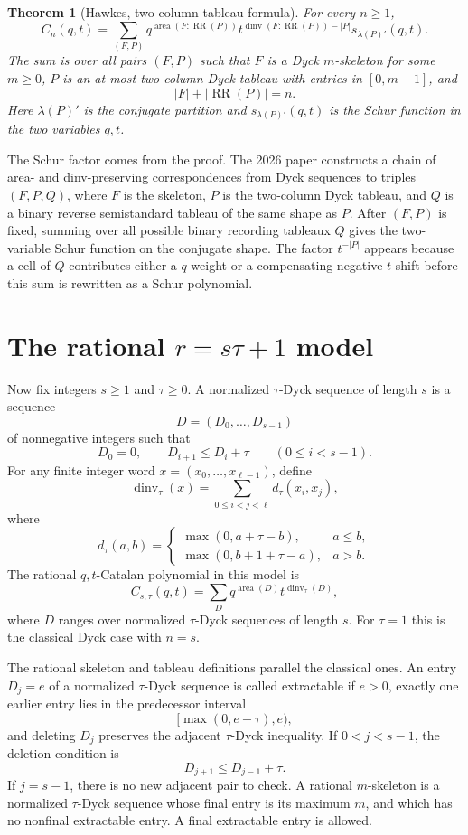 \documentclass{article}
\DeclareMathOperator{\area}{area}
\DeclareMathOperator{\dinv}{dinv}
\DeclareMathOperator{\RR}{RR}
\newtheorem{theorem}{Theorem}
\begin{document}
\begin{theorem}[Hawkes, two-column tableau formula]
For every \(n\ge1\),
\[
  C_n(q,t)
  =
  \sum_{(F,P)}
  q^{\area(F:\RR(P))}
  t^{\dinv(F:\RR(P))-|P|}
  s_{\lambda(P)'}(q,t).
\]
The sum is over all pairs \((F,P)\) such that \(F\) is a Dyck
\(m\)-skeleton for some \(m\ge0\), \(P\) is an at-most-two-column Dyck
tableau with entries in \([0,m-1]\), and
\[
  |F|+|\RR(P)|=n.
\]
Here \(\lambda(P)'\) is the conjugate partition and
\(s_{\lambda(P)'}(q,t)\) is the Schur function in the two variables \(q,t\).
\end{theorem}

The Schur factor comes from the proof.  The 2026 paper constructs a chain of
area- and dinv-preserving correspondences from Dyck sequences to triples
\((F,P,Q)\), where \(F\) is the skeleton, \(P\) is the two-column Dyck
tableau, and \(Q\) is a binary reverse semistandard tableau of the same shape
as \(P\).  After \((F,P)\) is fixed, summing over all possible binary
recording tableaux \(Q\) gives the two-variable Schur function on the
conjugate shape.  The factor \(t^{-|P|}\) appears because a cell of \(Q\)
contributes either a \(q\)-weight or a compensating negative \(t\)-shift before
this sum is rewritten as a Schur polynomial.

\section{The rational \(r=s\tau+1\) model}

Now fix integers \(s\ge1\) and \(\tau\ge0\).  A normalized \(\tau\)-Dyck
sequence of length \(s\) is a sequence
\[
  D=(D_0,\ldots,D_{s-1})
\]
of nonnegative integers such that
\[
  D_0=0,
  \qquad
  D_{i+1}\le D_i+\tau
  \qquad(0\le i<s-1).
\]
For any finite integer word \(x=(x_0,\ldots,x_{\ell-1})\), define
\[
  \dinv_\tau(x)
  =
  \sum_{0\le i<j<\ell} d_\tau(x_i,x_j),
\]
where
\[
  d_\tau(a,b)=
  \begin{cases}
    \max(0,a+\tau-b),& a\le b,\\
    \max(0,b+1+\tau-a),& a>b.
  \end{cases}
\]
The rational \(q,t\)-Catalan polynomial in this model is
\[
  C_{s,\tau}(q,t)
  =
  \sum_D q^{\area(D)}t^{\dinv_\tau(D)},
\]
where \(D\) ranges over normalized \(\tau\)-Dyck sequences of length \(s\).
For \(\tau=1\) this is the classical Dyck case with \(n=s\).

The rational skeleton and tableau definitions parallel the classical ones.  An
entry \(D_j=e\) of a normalized \(\tau\)-Dyck sequence is called extractable if
\(e>0\), exactly one earlier entry lies in the predecessor interval
\[
  [\max(0,e-\tau),e),
\]
and deleting \(D_j\) preserves the adjacent \(\tau\)-Dyck inequality.  If
\(0<j<s-1\), the deletion condition is
\[
  D_{j+1}\le D_{j-1}+\tau.
\]
If \(j=s-1\), there is no new adjacent pair to check.  A rational
\(m\)-skeleton is a normalized \(\tau\)-Dyck sequence whose final entry is its
maximum \(m\), and which has no nonfinal extractable entry.  A final
extractable entry is allowed.
\end{document}
